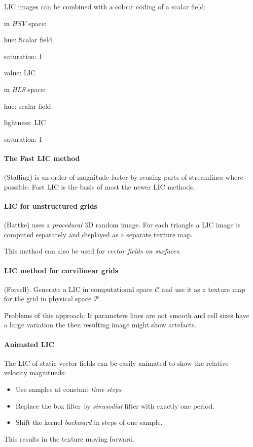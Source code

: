 LIC images can be combined with a colour coding of a scalar field:
\begin{description}
\item in \emph{HSV} space:
    \begin{description}
        \item hue: Scalar field
        \item saturation: 1
        \item value: LIC
    \end{description}
\item in \emph{HLS} space:
    \begin{description}
        \item hue: scalar field
        \item lightness: LIC
        \item saturation: 1
    \end{description}
\end{description}

\paragraph{The Fast LIC method} (Stalling) is an order of magnitude faster by reusing parts of streamlines where possible. Fast LIC is the basis of most the newer LIC methods.

\paragraph{LIC for unstructured grids} (Battke) uses a \emph{procedural} 3D random image. For each triangle a LIC image is computed separately and displayed as a separate texture map.

This method can also be used for \emph{vector fields on surfaces}.

\paragraph{LIC method for curvilinear grids} (Forsell). Generate a LIC in computational space $\mathcal C$ and use it as a texture map for the grid in physical space $\mathcal P$.

Problems of this approach: If parameters lines are not smooth and cell sizes have a large variation the then resulting image might show artefacts.

\paragraph{Animated LIC} The LIC of static vector fields can be easily animated to show the relative velocity magnitueds:
\begin{itemize}
    \item Use samples at constant \emph{time steps}
    \item Replace the box filter by \emph{sinusodial} filter with exactly one period.
    \item Shift the kernel \emph{backward} in steps of one sample.
\end{itemize}
This results in the texture moving forward.

